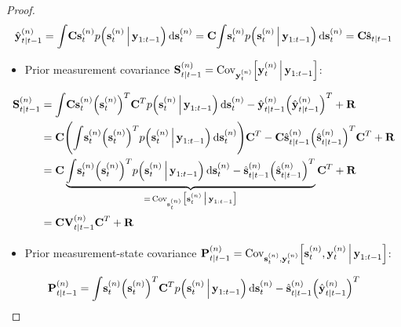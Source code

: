 \begin{proof}
\begin{align*}
				\hat{\boldsymbol{\mathrm{y}}}_{t \vert t - 1}^{(n)}
					= \int\! \boldsymbol{\mathrm{C}} \boldsymbol{\mathrm{s}}_t^{(n)} p\Big(\boldsymbol{\mathrm{s}}_t^{(n)} \,\Big\vert\, \boldsymbol{\mathrm{y}}_{1:t - 1}\Big) \dd{\boldsymbol{\mathrm{s}}_t^{(n)}}
					= \boldsymbol{\mathrm{C}} \! \int\! \boldsymbol{\mathrm{s}}_t^{(n)} p\Big(\boldsymbol{\mathrm{s}}_t^{(n)} \,\Big\vert\, \boldsymbol{\mathrm{y}}_{1:t - 1}\Big) \dd{\boldsymbol{\mathrm{s}}_t^{(n)}}
					= \boldsymbol{\mathrm{C}} \hat{\boldsymbol{\mathrm{s}}}_{t \vert t - 1}
			\end{align*}
			\begin{itemize}
				\item Prior measurement covariance \( \boldsymbol{\mathrm{S}}_{t \vert t - 1}^{(n)} = \operatorname{Cov}_{\boldsymbol{\mathrm{y}}_t^{(n)}}\!\Big[\boldsymbol{\mathrm{y}}_t^{(n)} \,\Big\vert\, \boldsymbol{\mathrm{y}}_{1:t - 1}\Big] \):
			\end{itemize}
			\begin{align*}
				\boldsymbol{\mathrm{S}}_{t \vert t - 1}^{(n)}
					&= \int\! \boldsymbol{\mathrm{C}} \boldsymbol{\mathrm{s}}_t^{(n)} \Big(\boldsymbol{\mathrm{s}}_t^{(n)}\Big)^T \boldsymbol{\mathrm{C}}^T p\Big(\boldsymbol{\mathrm{s}}_t^{(n)} \,\Big\vert\, \boldsymbol{\mathrm{y}}_{1:t - 1}\Big) \dd{\boldsymbol{\mathrm{s}}_t^{(n)}} - \hat{\boldsymbol{\mathrm{y}}}_{t \vert t - 1}^{(n)} \Big( \hat{\boldsymbol{\mathrm{y}}}_{t \vert t - 1}^{(n)} \Big)^T + \boldsymbol{\mathrm{R}} \\
					&= \boldsymbol{\mathrm{C}} \Bigg(\! \int\! \boldsymbol{\mathrm{s}}_t^{(n)} \Big(\boldsymbol{\mathrm{s}}_t^{(n)}\Big)^T p\Big(\boldsymbol{\mathrm{s}}_t^{(n)} \,\Big\vert\, \boldsymbol{\mathrm{y}}_{1:t - 1}\Big) \dd{\boldsymbol{\mathrm{s}}_t^{(n)}} \!\Bigg) \boldsymbol{\mathrm{C}}^T - \boldsymbol{\mathrm{C}} \hat{\boldsymbol{\mathrm{s}}}_{t \vert t - 1}^{(n)} \Big( \hat{\boldsymbol{\mathrm{s}}}_{t \vert t - 1}^{(n)} \Big)^T \boldsymbol{\mathrm{C}}^T + \boldsymbol{\mathrm{R}} \\
					&= \boldsymbol{\mathrm{C}} \underbrace{\int\! \boldsymbol{\mathrm{s}}_t^{(n)} \Big(\boldsymbol{\mathrm{s}}_t^{(n)}\Big)^T p\Big(\boldsymbol{\mathrm{s}}_t^{(n)} \,\Big\vert\, \boldsymbol{\mathrm{y}}_{1:t - 1}\Big) \dd{\boldsymbol{\mathrm{s}}_t^{(n)}} - \hat{\boldsymbol{\mathrm{s}}}_{t \vert t - 1}^{(n)} \Big( \hat{\boldsymbol{\mathrm{s}}}_{t \vert t - 1}^{(n)} \Big)^T}_{=\, \operatorname{Cov}_{\boldsymbol{\mathrm{s}}_t^{(n)}}\!\big[\boldsymbol{\mathrm{s}}_t^{(n)} \,\big\vert\, \boldsymbol{\mathrm{y}}_{1:t - 1}\big]} \boldsymbol{\mathrm{C}}^T + \boldsymbol{\mathrm{R}} \\
					&= \boldsymbol{\mathrm{C}} \boldsymbol{\mathrm{V}}_{t \vert t - 1}^{(n)} \boldsymbol{\mathrm{C}}^T + \boldsymbol{\mathrm{R}}
			\end{align*}
			\begin{itemize}
				\item Prior measurement-state covariance \( \boldsymbol{\mathrm{P}}_{t \vert t - 1}^{(n)} = \operatorname{Cov}_{\boldsymbol{\mathrm{s}}_t^{(n)}, \boldsymbol{\mathrm{y}}_t^{(n)}}\!\Big[\boldsymbol{\mathrm{s}}_t^{(n)}, \boldsymbol{\mathrm{y}}_t^{(n)} \,\Big\vert\, \boldsymbol{\mathrm{y}}_{1:t - 1}\Big] \):
			\end{itemize}
			\begin{align*}
				\mat{P}_{t \subgiven t - 1}^{(n)}
					&= \int\! \vec{s}_t^{(n)} \Big(\vec{s}_t^{(n)}\Big)^T \mat{C}^T p\Big(\vec{s}_t^{(n)} \Biggiven \vec{y}_{1:t - 1}\Big) \dd{\vec{s}_t^{(n)}} - \hat{\vec{s}}_{t \subgiven t - 1}^{(n)} \Big(\hat{\vec{y}}_{t \subgiven t - 1}^{(n)}\Big)^T \\

\end{align*}
\end{proof}
